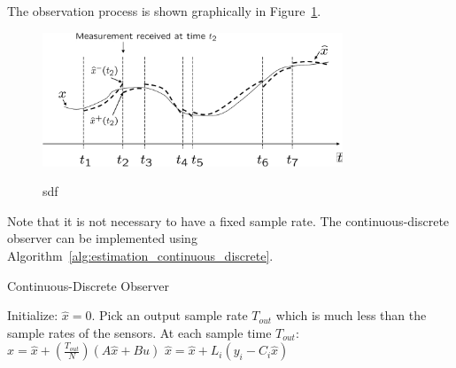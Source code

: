 {The observation process is shown graphically in
Figure~\ref{fig:estimation_continuous_discrete}.
\begin{figure}
  \centering
  \includegraphics[width=0.8\textwidth]{chap11_attitude_estimation/figures/estimation-continuous-discrete}\\
  \caption{sdf}
  \label{fig:estimation_continuous_discrete}
\end{figure}
Note that it is not necessary to have a fixed sample rate.  The
continuous-discrete observer can be implemented using
Algorithm~\ref{alg:estimation_continuous_discrete}.

\begin{algorithm}
\caption{Continuous-Discrete Observer}
\label{alg:estimation_continuous_discrete}
\begin{algorithmic}[1]
    \STATE Initialize:  $\hat{x} = 0$.
    \STATE Pick an output sample rate $T_{out}$ which is much less than
    the sample rates of the sensors.
    \STATE At each sample time $T_{out}$:
        \STATE $\hat{x} = \hat{x} + \left(\frac{T_{out}}{N}\right) \left(
        A\hat{x} + B u\right)$
    \ENDFOR
        \STATE $\hat{x} = \hat{x} +  L_i\left( y_i - C_i \hat{x} \right)$
    \ENDIF
\end{algorithmic}
\end{algorithm}

}
